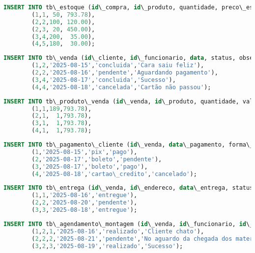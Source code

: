 \documentclass[
12pt,
a4paper,
semrecuonosumario,
sumario = abnt-6027-2012]{report}
\begin{document}
    \begin{lstlisting}[language=SQL,caption={DML -- Tabela \texttt{tb\_estoque}}]
        INSERT INTO tb\_estoque (id\_compra, id\_produto, quantidade, preco\_estoque) VALUES
        (1,1, 50, 793.78),
        (2,2,100, 120.00),
        (2,3, 20, 450.00),
        (3,4,200,  35.00),
        (4,5,180,  30.00);
    \end{lstlisting}
    
    \begin{lstlisting}[language=SQL,caption={DML -- Tabela \texttt{tb\_venda}}]
        INSERT INTO tb\_venda (id\_cliente, id\_funcionario, data, status, observacao\_venda) VALUES
        (1,2,'2025-08-15','concluida','Cara saiu feliz'),
        (2,2,'2025-08-16','pendente','Aguardando pagamento'),
        (3,4,'2025-08-17','concluida','Sucesso'),
        (4,4,'2025-08-18','cancelada','Cartão não passou');
    \end{lstlisting}
    
    \begin{lstlisting}[language=SQL,caption={DML -- Tabela \texttt{tb\_produto\_venda}}]
        INSERT INTO tb\_produto\_venda (id\_venda, id\_produto, quantidade, valor) VALUES
        (1,1,189,793.78),
        (2,1,  1,793.78),
        (3,1,  1,793.78),
        (4,1,  1,793.78);
    \end{lstlisting}
    
    \begin{lstlisting}[language=SQL,caption={DML -- Tabela \texttt{tb\_pagamento\_cliente}}]
        INSERT INTO tb\_pagamento\_cliente (id\_venda, data\_pagamento, forma\_pagamento, status\_pagamento) VALUES
        (1,'2025-08-15','pix','pago'),
        (2,'2025-08-17','boleto','pendente'),
        (3,'2025-08-17','boleto','pago'),
        (4,'2025-08-18','cartao\_credito','cancelado');
    \end{lstlisting}
    
    \begin{lstlisting}[language=SQL,caption={DML -- Tabela \texttt{tb\_entrega}}]
        INSERT INTO tb\_entrega (id\_venda, id\_endereco, data\_entrega, status\_entrega) VALUES
        (1,1,'2025-08-16','entregue'),
        (2,2,'2025-08-20','pendente'),
        (3,3,'2025-08-18','entregue');
    \end{lstlisting}
    
    \begin{lstlisting}[language=SQL,caption={DML -- Tabela \texttt{tb\_agendamento\_montagem}}]
        INSERT INTO tb\_agendamento\_montagem (id\_venda, id\_funcionario, id\_endereco, data, status\_montagem, observacao) VALUES
        (1,2,1,'2025-08-16','realizado','Cliente chato'),
        (2,2,2,'2025-08-21','pendente','No aguardo da chegada dos materiais'),
        (3,2,3,'2025-08-19','realizado','Sucesso');
    \end{lstlisting}
    
\end{document}
